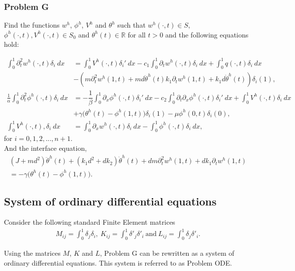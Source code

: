 \documentclass[../../main.tex]{subfiles}
\begin{document}
\subsubsection{Problem G}
Find the functions $w^h$, $\phi^h$, $V^h$ and $\theta^h$ such that $w^h(\cdot,t) \in S$,  $\phi^h(\cdot,t),V^h(\cdot,t) \in S_0$ and $\theta^h(t) \in \mathbb{R}$ for all $t>0$ and the following equations hold:

\begin{align}
\int_0^1 \partial^2_t w^h(\cdot,t) \delta_i \ dx & =   \int_0^1 V^h(\cdot,t) \delta_i' \ dx - c_1 \int_0^1 \partial_t w^h(\cdot,t) \delta_i \ dx + \int_0^1 q(\cdot,t) \delta_i \ dx \nonumber \\
 & -(m \partial_t^2 w^h(1,t) +  md \ddot \theta^h(t)k_1 \partial_t w^h(1,t) + k_1 d \dot \theta^h(t))\delta_i(1), \\
\frac{1}{\alpha} \int_0^1 \partial^2_t \phi^h(\cdot,t) \delta_i \ dx & = -\dfrac{1}{\beta}\int_0^1\partial_x \phi^h(\cdot,t)\delta_i' \ dx - c_2 \int_0^1 \partial_t \partial_x \phi^h(\cdot,t) \delta_i' \ dx + \int_0^1 V^h(\cdot,t) \delta_i \ dx \nonumber \\
 & +\gamma \big(\theta^h(t) - \phi^h(1,t)\big)\delta_i(1) - \mu \phi^h(0,t)\delta_i(0),\\
\int_0^1 V^h(\cdot,t),\delta_i \ dx &= \int_0^1 \partial_x w^h(\cdot,t) \delta_i \ dx -  \int_0^1 \phi^h(\cdot,t) \delta_i \ dx, 
\end{align}
for $i = 0,1,2,...,n+1$.\\

And the interface equation,
\begin{align}
(J+ md^2) \ddot \theta^h(t)+ (k_1 d^2 + d k_2) \dot \theta^h(t)  + dm \partial_t^2 w^h(1,t)
  + dk_1 \partial_t w^h(1,t) \nonumber\\
  =  -\gamma \big(\theta^h(t) - \phi^h(1,t)\big).
\end{align}

\subsection{System of ordinary differential equations}
Consider the following standard Finite Element matrices
\begin{align*}\label{ch6_eq10}
M_{ij} = \int_0^1 \delta_j \delta_i, ~K_{ij} = \int_0^1 \delta'_j\delta'_i ~\textrm{and} ~L_{ij} = \int_0^1 \delta_j\delta'_i.
\end{align*}

Using the matrices $M$, $K$ and $L$, Problem G can be rewritten as a system of ordinary differential equations. This system is referred to as Problem ODE.
\end{document}
